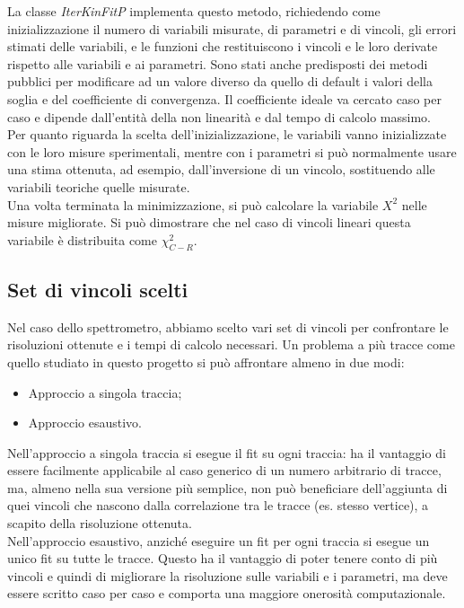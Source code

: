 \documentclass[8pt]{extarticle}
\begin{document}
La classe \textit{IterKinFitP} implementa questo metodo, richiedendo come inizializzazione il numero di variabili misurate, di parametri e di vincoli, gli errori stimati delle variabili, e le funzioni che restituiscono i vincoli e le loro derivate rispetto alle variabili e ai parametri. Sono stati anche predisposti dei metodi pubblici per modificare ad un valore diverso da quello di default i valori della soglia e del coefficiente di convergenza. Il coefficiente ideale va cercato caso per caso e dipende dall'entità della non linearità e dal tempo di calcolo massimo. \\

Per quanto riguarda la scelta dell'inizializzazione, le variabili vanno inizializzate con le loro misure sperimentali, mentre con i parametri si può normalmente usare una stima ottenuta, ad esempio, dall'inversione di un vincolo, sostituendo alle variabili teoriche quelle misurate. \\

Una volta terminata la minimizzazione, si può calcolare la variabile $X^2$ nelle misure migliorate. Si può dimostrare che nel caso di vincoli lineari questa variabile è distribuita come $\chi^2_{C-R}$. \\
\subsection{Set di vincoli scelti}
Nel caso dello spettrometro, abbiamo scelto vari set di vincoli per confrontare le risoluzioni ottenute e i tempi di calcolo necessari. Un problema a più tracce come quello studiato in questo progetto si può affrontare almeno in due modi:
\begin{itemize}
\item Approccio a singola traccia;
\item Approccio esaustivo.
\end{itemize}

Nell'approccio a singola traccia si esegue il fit su ogni traccia: ha il vantaggio di essere facilmente applicabile al caso generico di un numero arbitrario di tracce, ma, almeno nella sua versione più semplice, non può beneficiare dell'aggiunta di quei vincoli che nascono dalla correlazione tra le tracce (es. stesso vertice), a scapito della risoluzione ottenuta. \\
Nell'approccio esaustivo, anziché eseguire un fit per ogni traccia si esegue un unico fit su tutte le tracce. Questo ha il vantaggio di poter tenere conto di più vincoli e quindi di migliorare la risoluzione sulle variabili e i parametri, ma deve essere scritto caso per caso e comporta una maggiore onerosità computazionale. \medskip
\end{document}
